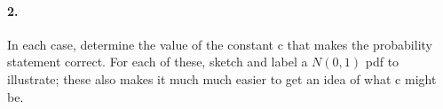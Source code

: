 \begin{enumerate}[label=(\alph*)]
\begin{mdframed}
\begin{multicols}{2}
\begin{tikzpicture}
                    \end{tikzpicture}
            \end{multicols}
            
        \end{mdframed}
    \end{enumerate}

    \pagebreak

    \paragraph*{2.}
    In each case, determine the value of the constant c that makes the probability statement correct. For each of these, sketch and label a $N(0,1)$ pdf to illustrate; these also makes it much much easier to get an idea of what c might be.

